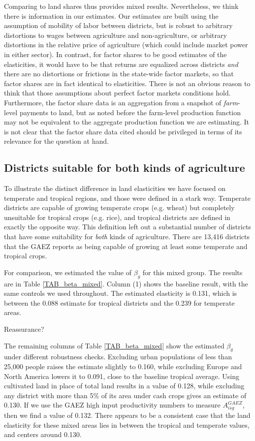 \documentclass[11pt]{article}
\begin{document}
Comparing to land shares thus provides mixed results. Nevertheless, we think there is information in our estimates. Our estimates are built using the assumption of mobility of labor between districts, but is robust to arbitrary distortions to wages between agriculture and non-agriculture, or arbitrary distortions in the relative price of agriculture (which could include market power in either sector). In contrast, for factor shares to be good estimates of the elasticities, it would have to be that returns are equalized across districts \textit{and} there are no distortions or frictions in the state-wide factor markets, so that factor shares are in fact identical to elasticities. There is not an obvious reason to think that those assumptions about perfect factor markets conditions hold. Furthermore, the factor share data is an aggregation from a snapshot of \textit{farm}-level payments to land, but as noted before the farm-level production function may not be equivalent to the aggregate production function we are estimating. It is not clear that the factor share data cited should be privileged in terms of its relevance for the question at hand.

\subsection{Districts suitable for both kinds of agriculture}
To illustrate the distinct difference in land elasticities we have focused on temperate and tropical regions, and those were defined in a stark way. Temperate districts are capable of growing temperate crops (e.g. wheat) but completely unsuitable for tropical crops (e.g. rice), and tropical districts are defined in exactly the opposite way. This definition left out a substantial number of districts that have some suitability for \textit{both} kinds of agriculture. There are 13,416 districts that the GAEZ reports as being capable of growing at least some temperate and tropical crops. 

For comparison, we estimated the value of $\beta_g$ for this mixed group. The results are in Table \ref{TAB_beta_mixed}. Column (1) shows the baseline result, with the same controls we used throughout. The estimated elasticity is 0.131, which is between the 0.088 estimate for tropical districts and the 0.239 for temperate areas. 

Reassurance?

The remaining columns of Table \ref{TAB_beta_mixed} show the estimated $\beta_g$ under different robustness checks. Excluding urban populations of less than 25,000 people raises the estimate slightly to 0.160, while excluding Europe and North America lowers it to 0.091, close to the baseline tropical average. Using cultivated land in place of total land results in a value of 0.128, while excluding any district with more than 5\% of its area under cash crops gives an estimate of 0.130. If we use the GAEZ high input productivity numbers to measure $A^{GAEZ}_{isg}$, then we find a value of 0.132. There appears to be a consistent case that the land elasticity for these mixed areas lies in between the tropical and temperate values, and centers around 0.130. 
\end{document}
